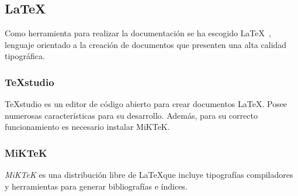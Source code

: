 \subsection{\LaTeX}
Como herramienta para realizar la documentación se ha escogido \LaTeX{}~\cite{wiki:latex}, lenguaje orientado a la creación de documentos que presenten una alta calidad tipográfica.

\subsubsection{TeXstudio}
TeXstudio es un editor de código abierto para crear documentos \LaTeX. Posee numerosas características para su desarrollo. Además, para su correcto funcionamiento es necesario instalar MiKTeK.

\subsubsection{MiKTeK}
\textit{MiKTeK} es una distribución libre de \LaTeX que incluye tipografías compiladores y herramientas para generar bibliografías e índices.

